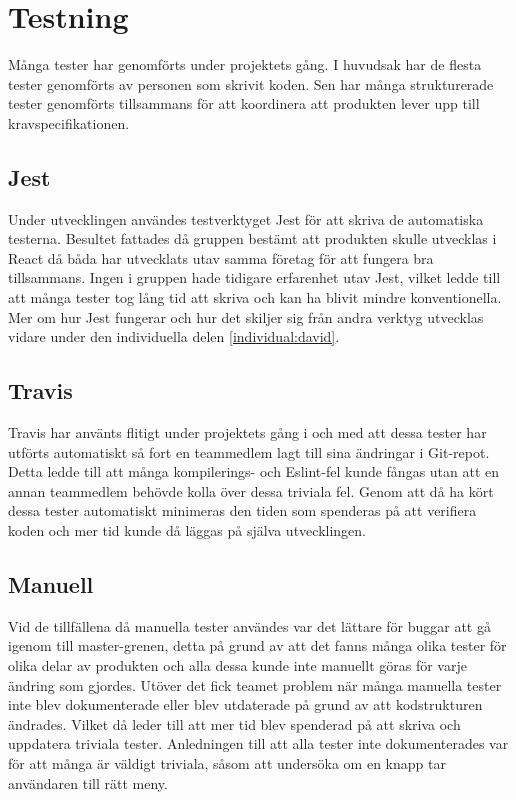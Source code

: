 \section{Testning}
Många tester har genomförts under projektets gång. I huvudsak har de flesta tester genomförts av personen som skrivit koden. Sen har många strukturerade tester genomförts tillsammans för att koordinera att produkten lever upp till kravspecifikationen. 

\subsection{Jest}
Under utvecklingen användes testverktyget Jest för att skriva de automatiska testerna. Besultet fattades då gruppen bestämt att produkten skulle utvecklas i React då båda har utvecklats utav samma företag för att fungera bra tillsammans. Ingen i gruppen hade tidigare erfarenhet utav Jest, vilket ledde till att många tester tog lång tid att skriva och kan ha blivit mindre konventionella. Mer om hur Jest fungerar och hur det skiljer sig från andra verktyg utvecklas vidare under den individuella delen \ref{individual:david}.

\subsection{Travis}
Travis har använts flitigt under projektets gång i och med att dessa tester har utförts automatiskt så fort en teammedlem lagt till sina ändringar i Git-repot. Detta ledde till att många kompilerings- och Eslint-fel kunde fångas utan att en annan teammedlem behövde kolla över dessa triviala fel. Genom att då ha kört dessa tester automatiskt minimeras den tiden som spenderas på att verifiera koden och mer tid kunde då läggas på själva utvecklingen. 

\subsection{Manuell}
Vid de tillfällena då manuella tester användes var det lättare för buggar att gå igenom till master-grenen, detta på grund av att det fanns många olika tester för olika delar av produkten och alla dessa kunde inte manuellt göras för varje ändring som gjordes. Utöver det fick teamet problem när många manuella tester inte blev dokumenterade eller blev utdaterade på grund av att kodstrukturen ändrades. Vilket då leder till att mer tid blev spenderad på att skriva och uppdatera triviala tester. Anledningen till att alla tester inte dokumenterades var för att många är väldigt triviala, såsom att undersöka om en knapp tar användaren till rätt meny. 
